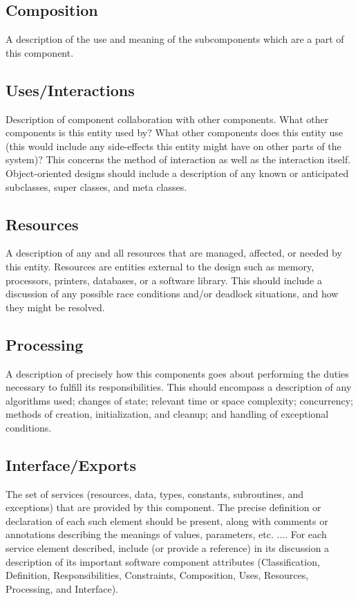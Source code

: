 \documentclass[12pt, a4paper]{report}
\begin{document}
\subsection{Composition}
A description of the use and meaning of the subcomponents which are a part of this component. 
\subsection{Uses/Interactions}
Description of component collaboration with other components. What other components is this entity used by? What other components does this entity use (this would include any side-effects this entity might have on other parts of the system)? This concerns the method of interaction as well as the interaction itself. Object-oriented designs should include a description of any known or anticipated subclasses, super classes, and meta classes. 
\subsection{Resources}
A description of any and all resources that are managed, affected, or needed by this entity. Resources are entities external to the design such as memory, processors, printers, databases, or a software library. This should include a discussion of any possible race conditions and/or deadlock situations, and how they might be resolved. 
\subsection{Processing}
A description of precisely how this components goes about performing the duties necessary to fulfill its responsibilities. This should encompass a description of any algorithms used; changes of state; relevant time or space complexity; concurrency; methods of creation, initialization, and cleanup; and handling of exceptional conditions. 
\subsection{Interface/Exports}
The set of services (resources, data, types, constants, subroutines, and exceptions) that are provided by this component. The precise definition or declaration of each such element should be present, along with comments or annotations describing the meanings of values, parameters, etc. .... For each service element described, include (or provide a reference) in its discussion a description of its important software component attributes (Classification, Definition, Responsibilities, Constraints, Composition, Uses, Resources, Processing, and Interface). 
\end{document}
